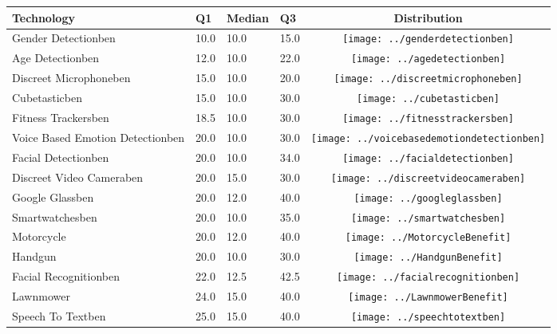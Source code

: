 \begin{table}[t]
\begin{center}
\small
\begin{tabular}{| p{2cm} | p{1cm} | p{1cm} | p{1cm} | c |}
\hline
Technology & Q1 &  Median & Q3 & Distribution  \\ 
\hline
Gender Detectionben & 10.0 & 10.0 & 15.0 & \texttt{[image: ../genderdetectionben]} \\ 
Age Detectionben & 12.0 & 10.0 & 22.0 & \texttt{[image: ../agedetectionben]} \\ 
Discreet Microphoneben & 15.0 & 10.0 & 20.0 & \texttt{[image: ../discreetmicrophoneben]} \\ 
Cubetasticben & 15.0 & 10.0 & 30.0 & \texttt{[image: ../cubetasticben]} \\ 
Fitness Trackersben & 18.5 & 10.0 & 30.0 & \texttt{[image: ../fitnesstrackersben]} \\ 
Voice Based Emotion Detectionben & 20.0 & 10.0 & 30.0 & \texttt{[image: ../voicebasedemotiondetectionben]} \\ 
Facial Detectionben & 20.0 & 10.0 & 34.0 & \texttt{[image: ../facialdetectionben]} \\ 
Discreet Video Cameraben & 20.0 & 15.0 & 30.0 & \texttt{[image: ../discreetvideocameraben]} \\ 
Google Glassben & 20.0 & 12.0 & 40.0 & \texttt{[image: ../googleglassben]} \\ 
Smartwatchesben & 20.0 & 10.0 & 35.0 & \texttt{[image: ../smartwatchesben]} \\ 
Motorcycle & 20.0 & 12.0 & 40.0 & \texttt{[image: ../MotorcycleBenefit]} \\ 
Handgun & 20.0 & 10.0 & 30.0 & \texttt{[image: ../HandgunBenefit]} \\ 
Facial Recognitionben & 22.0 & 12.5 & 42.5 & \texttt{[image: ../facialrecognitionben]} \\ 
Lawnmower & 24.0 & 15.0 & 40.0 & \texttt{[image: ../LawnmowerBenefit]} \\ 
Speech To Textben & 25.0 & 15.0 & 40.0 & \texttt{[image: ../speechtotextben]} \\ 

\end{tabular}
\end{center}
\end{table}
